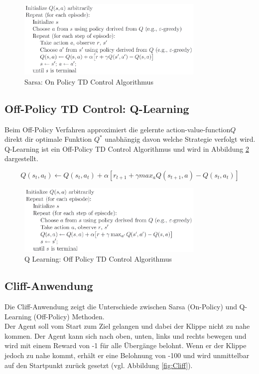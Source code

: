 \documentclass[10pt]{scrartcl}
\begin{document}
\begin{figure}[htbp]
	\centering	\includegraphics[width=0.8\textwidth]{Bilder/Sarsa.png}
	\caption{Sarsa: On Policy TD Control Algorithmus}
	\label{fig:Sarsa}
\end{figure}


\subsection{Off-Policy TD Control: Q-Learning}
Beim Off-Policy Verfahren approximiert die gelernte \glqq action-value-function\grqq\xspace $Q$  direkt dir optimale Funktion $Q^{*}$ unabhängig davon welche Strategie verfolgt wird. Q-Learning ist ein Off-Policy TD Control Algorithmus und wird in Abbildung \ref{fig:QLearning} dargestellt.
 
\begin{equation}
Q(s_{t},a_{t}) \leftarrow Q(s_{t},a_{t}) + \alpha [r_{t+1} + \gamma max_{a} Q(s_{t+1},a) - Q(s_{t},a_{t})]
\end{equation} 
 
\begin{figure}[htbp]
	\centering	\includegraphics[width=0.8\textwidth]{Bilder/Q-Learning.png}
	\caption{Q Learning: Off Policy TD Control Algorithmus}
	\label{fig:QLearning}
\end{figure}

\subsection{Cliff-Anwendung}
Die Cliff-Anwendung zeigt die Unterschiede zwischen Sarsa (On-Policy) und Q-Learning (Off-Policy) Methoden.\\
Der Agent soll vom Start zum Ziel gelangen und dabei der Klippe nicht zu nahe kommen. Der Agent kann sich nach oben, unten, links und rechts bewegen und wird mit einem Reward von -1 für alle Übergänge belohnt. Wenn er der Klippe jedoch zu nahe kommt, erhält er eine Belohnung von -100 und wird unmittelbar auf den Startpunkt zurück gesetzt (vgl. Abbildung \ref{fig:Cliff}).
\end{document}
